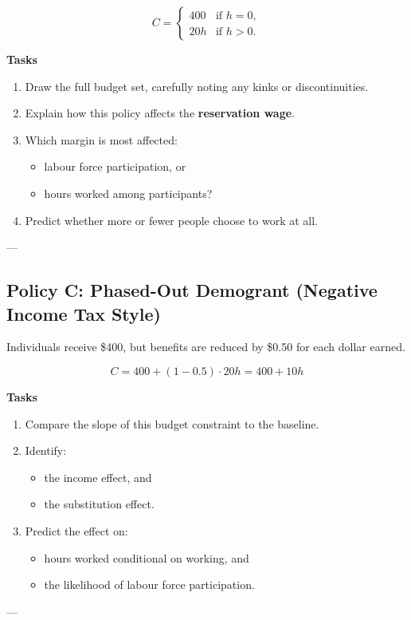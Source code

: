 \documentclass[12pt]{article}
\begin{document}
\[
C =
\begin{cases}
400 & \text{if } h = 0, \\
20h & \text{if } h > 0.
\end{cases}
\]

\textbf{Tasks}
\begin{enumerate}
\item Draw the full budget set, carefully noting any kinks or discontinuities.
\item Explain how this policy affects the \textbf{reservation wage}.
\item Which margin is most affected:
\begin{itemize}
    \item labour force participation, or
    \item hours worked among participants?
\end{itemize}
\item Predict whether more or fewer people choose to work at all.
\end{enumerate}

---

\subsection*{Policy C: Phased-Out Demogrant (Negative Income Tax Style)}

Individuals receive \$400, but benefits are reduced by \$0.50 for each dollar earned.

\[
C = 400 + (1 - 0.5)\cdot 20h = 400 + 10h
\]

\textbf{Tasks}
\begin{enumerate}
\item Compare the slope of this budget constraint to the baseline.
\item Identify:
\begin{itemize}
    \item the income effect, and
    \item the substitution effect.
\end{itemize}
\item Predict the effect on:
\begin{itemize}
    \item hours worked conditional on working, and
    \item the likelihood of labour force participation.
\end{itemize}
\end{enumerate}

---
\end{document}

